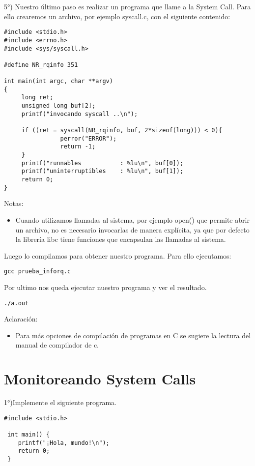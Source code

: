 5°) Nuestro último paso es realizar un programa que llame a la System Call. Para ello crearemos un archivo, por ejemplo syscall.c, con el siguiente contenido:

\begin{verbatim}
#include <stdio.h>
#include <errno.h>
#include <sys/syscall.h>

#define NR_rqinfo 351

int main(int argc, char **argv)
{
     long ret;
     unsigned long buf[2];
     printf("invocando syscall ..\n");

     if ((ret = syscall(NR_rqinfo, buf, 2*sizeof(long))) < 0){
                perror("ERROR");
                return -1;
     }
     printf("runnables           : %lu\n", buf[0]);
     printf("uninterruptibles    : %lu\n", buf[1]);
     return 0;
}
\end{verbatim}


Notas:
\begin{itemize}  
\item Cuando utilizamos llamadas al sistema, por ejemplo open() que permite abrir un archivo, no es necesario invocarlas de manera explícita, ya que por defecto la librería libc tiene funciones que encapsulan las llamadas al sistema. 
\end{itemize}  

Luego lo compilamos para obtener nuestro programa. Para ello ejecutamos:
\begin{verbatim}
gcc prueba_inforq.c
\end{verbatim}

Por ultimo nos queda ejecutar nuestro programa y ver el resultado.
\begin{verbatim}
./a.out
\end{verbatim}

Aclaración: 
\begin{itemize}  
\item Para más opciones de compilación de programas en C se sugiere la lectura del manual de compilador de c.
\end{itemize}  


\section{Monitoreando System Calls}
1°)Implemente el siguiente programa.
\begin{verbatim}
#include <stdio.h>
 
 int main() {
    printf("¡Hola, mundo!\n");
    return 0;
 }
\end{verbatim}


